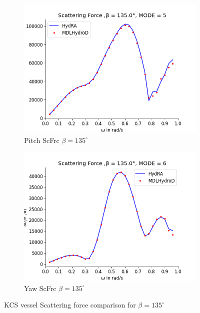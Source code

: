 \begin{figure}[H]
\begin{subfigure}[b]{0.49\textwidth}
        \includegraphics[width=\textwidth]{plots/kcs/sc/sc5.png}
        \caption{Pitch ScFrc $\beta = 135^{\circ}$}
    \end{subfigure}
    \begin{subfigure}[b]{0.49\textwidth}
        \includegraphics[width=\textwidth]{plots/kcs/sc/sc6.png}
        \caption{Yaw ScFrc $\beta = 135^{\circ}$}
    \end{subfigure}
    \caption{KCS vessel Scattering force comparison for $\beta= 135^{\circ}$}
    \label{fig:kcs_scattering_135}
\end{figure}

